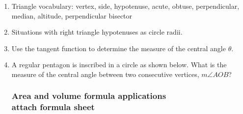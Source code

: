 \documentclass[12pt, twoside]{article}
\begin{document}
\begin{enumerate}

\newpage  
  \item Triangle vocabulary: vertex, side, hypotenuse, acute, obtuse, perpendicular, median, altitude, perpendicular bisector
  
  \item Situations with right triangle hypotenuses as circle radii.

  \item Use the tangent function to determine the measure of the central angle $\theta$.
  
  \item A regular pentagon is inscribed in a circle as shown below. What is the measure of the central angle between two consecutive vertices, $m\angle AOB$?
  
\subsubsection*{Area and volume formula applications\\attach formula sheet}




\end{enumerate}
\end{document}
